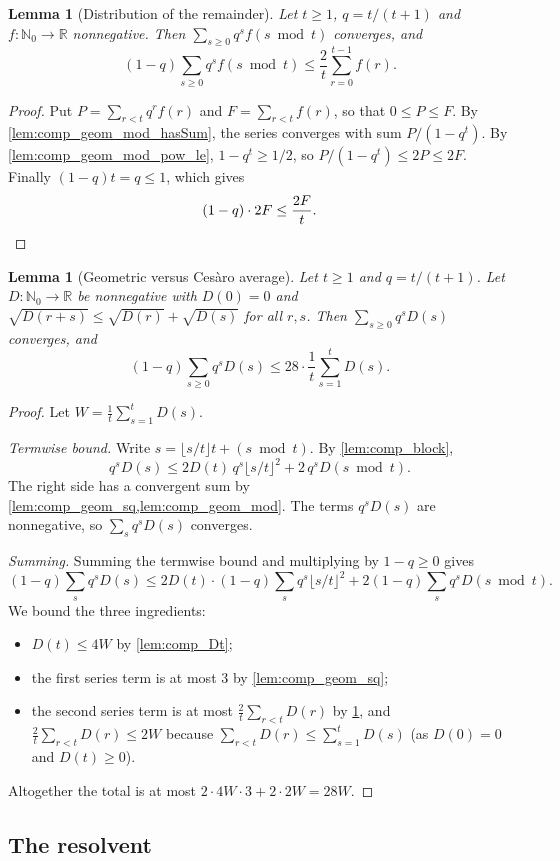 \documentclass[11pt]{article}
\newtheorem{lemma}[theorem]{Lemma}
\theoremstyle{definition}
\theoremstyle{remark}
\newcommand{\R}{\mathbb{R}}
\newcommand{\Nz}{\mathbb{N}_0}
\begin{document}
\begin{lemma}[Distribution of the remainder]\label{lem:comp_geom_mod}
Let $t\ge1$, $q=t/(t+1)$ and $f:\Nz\to\R$ nonnegative. Then $\sum_{s\ge0}q^sf(s\bmod t)$ converges, and
\[
(1-q)\sum_{s\ge0}q^sf(s\bmod t)\le\frac2t\sum_{r=0}^{t-1}f(r).
\]
\end{lemma}
\begin{proof}
Put $P=\sum_{r<t}q^rf(r)$ and $F=\sum_{r<t}f(r)$, so that $0\le P\le F$. By \cref{lem:comp_geom_mod_hasSum}, the series converges with sum $P/(1-q^t)$. By \cref{lem:comp_geom_mod_pow_le}, $1-q^t\ge1/2$, so $P/(1-q^t)\le2P\le2F$. Finally $(1-q)t=q\le1$, which gives
\[
(1-q)\cdot2F\le\frac{2F}{t}. \qedhere
\]
\end{proof}

\begin{lemma}[Geometric versus Ces\`aro average]\label{lem:comp_real}
Let $t\ge1$ and $q=t/(t+1)$. Let $D:\Nz\to\R$ be nonnegative with $D(0)=0$ and $\sqrt{D(r+s)}\le\sqrt{D(r)}+\sqrt{D(s)}$ for all $r,s$. Then $\sum_{s\ge0}q^sD(s)$ converges, and
\[
(1-q)\sum_{s\ge0}q^sD(s)\le28\cdot\frac1t\sum_{s=1}^tD(s).
\]
\end{lemma}
\begin{proof}
Let $W=\frac1t\sum_{s=1}^tD(s)$.

\emph{Termwise bound.} Write $s=\lfloor s/t\rfloor t+(s\bmod t)$. By \cref{lem:comp_block},
\[
q^sD(s)\le2D(t)\,q^s\lfloor s/t\rfloor^2+2\,q^sD(s\bmod t).
\]
The right side has a convergent sum by \cref{lem:comp_geom_sq,lem:comp_geom_mod}. The terms $q^sD(s)$ are nonnegative, so $\sum_s q^sD(s)$ converges.

\emph{Summing.} Summing the termwise bound and multiplying by $1-q\ge0$ gives
\[
(1-q)\sum_sq^sD(s)\le2D(t)\cdot(1-q)\sum_sq^s\lfloor s/t\rfloor^2+2(1-q)\sum_sq^sD(s\bmod t).
\]
We bound the three ingredients:
\begin{itemize}
\item $D(t)\le4W$ by \cref{lem:comp_Dt};
\item the first series term is at most $3$ by \cref{lem:comp_geom_sq};
\item the second series term is at most $\frac2t\sum_{r<t}D(r)$ by \cref{lem:comp_geom_mod}, and $\frac2t\sum_{r<t}D(r)\le2W$ because $\sum_{r<t}D(r)\le\sum_{s=1}^tD(s)$ (as $D(0)=0$ and $D(t)\ge0$).
\end{itemize}
Altogether the total is at most $2\cdot4W\cdot3+2\cdot2W=28W$.
\end{proof}

\subsection{The resolvent}
\end{document}
